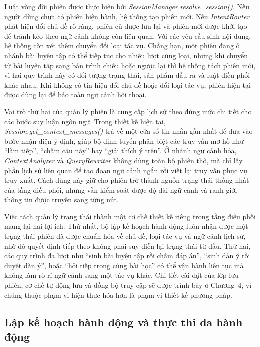 \documentclass[../DoAn.tex]{subfiles}
\begin{document}
Luật vòng đời phiên được thực hiện bởi \textit{SessionManager.resolve\_session()}. Nếu người dùng chưa có phiên hiện hành, hệ thống tạo phiên mới. Nếu \textit{IntentRouter} phát hiện đổi chủ đề rõ ràng, phiên cũ được lưu lại và phiên mới được khởi tạo để tránh kéo theo ngữ cảnh không còn liên quan. Với các yêu cầu sinh nội dung, hệ thống còn xét thêm chuyển đổi loại tác vụ. Chẳng hạn, một phiên đang ở nhánh bài luyện tập có thể tiếp tục cho nhiều lượt cùng loại, nhưng khi chuyển từ bài luyện tập sang bản trình chiếu hoặc ngược lại thì hệ thống tách phiên mới, vì hai quy trình này có đối tượng trạng thái, sản phẩm đầu ra và luật điều phối khác nhau. Khi không có tín hiệu đổi chủ đề hoặc đổi loại tác vụ, phiên hiện tại được dùng lại để bảo toàn ngữ cảnh hội thoại.

Vai trò thứ hai của quản lý phiên là cung cấp lịch sử theo đúng mức chi tiết cho các bước suy luận ngôn ngữ. Trong thiết kế hiện tại, \textit{Session.get\_context\_messages()} trả về một cửa sổ tin nhắn gần nhất để đưa vào bước nhận diện ý định, giúp bộ định tuyến phân biệt các truy vấn mơ hồ như ``làm tiếp'', ``chấm câu này'' hay ``giải thích ý trên''. Ở nhánh ngữ cảnh hóa, \textit{ContextAnalyzer} và \textit{QueryRewriter} không dùng toàn bộ phiên thô, mà chỉ lấy phần lịch sử liên quan để tạo đoạn ngữ cảnh ngắn rồi viết lại truy vấn phục vụ truy xuất. Cách dùng này giữ cho phiên trở thành nguồn trạng thái thống nhất của tầng điều phối, nhưng vẫn kiểm soát được độ dài ngữ cảnh và ranh giới thông tin được truyền sang từng nút.

Việc tách quản lý trạng thái thành một cơ chế thiết kế riêng trong tầng điều phối mang lại hai lợi ích. Thứ nhất, bộ lập kế hoạch hành động luôn nhận được một trạng thái phiên đã được chuẩn hóa về chủ đề, loại tác vụ và ngữ cảnh lịch sử, nhờ đó quyết định tiếp theo không phải suy diễn lại trạng thái từ đầu. Thứ hai, các quy trình đa lượt như ``sinh bài luyện tập rồi chấm đáp án'', ``sinh dàn ý rồi duyệt dàn ý'', hoặc ``hỏi tiếp trong cùng bài học'' có thể vận hành liên tục mà không làm rò rỉ ngữ cảnh sang một tác vụ khác. Chi tiết cài đặt của lớp lưu phiên, cơ chế tự động lưu và đồng bộ truy cập sẽ được trình bày ở Chương~4, vì chúng thuộc phạm vi hiện thực hóa hơn là phạm vi thiết kế phương pháp.

\subsection{Lập kế hoạch hành động và thực thi đa hành động}
\end{document}
